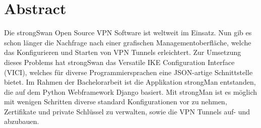 \section{Abstract}
Die strongSwan Open Source VPN Software ist weltweit im Einsatz. Nun gib es schon länger die Nachfrage nach einer grafischen Managementoberfläche, welche das Konfigurieren und Starten von VPN Tunnels erleichtert.
\medskip
Zur Umsetzung dieses Problems hat strongSwan das Versatile IKE Configuration Interface (VICI), welches für diverse Programmiersprachen eine JSON-artige Schnittstelle bietet. 
\medskip
Im Rahmen der Bachelorarbeit ist die Applikation strongMan entstanden, die auf dem Python Webframework Django basiert.
\medskip
Mit strongMan ist es möglich mit wenigen Schritten diverse standard Konfigurationen vor zu nehmen, Zertifikate und private Schlüssel zu verwalten, sowie die VPN Tunnels auf- und abzubauen.

